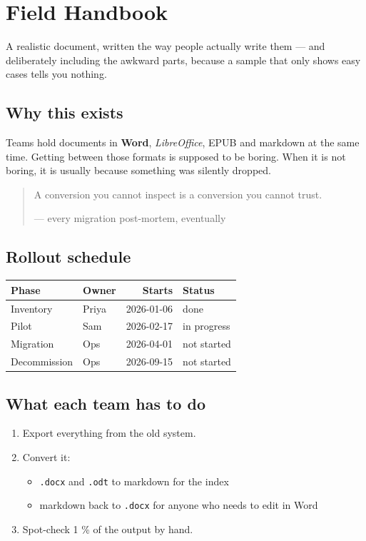 \documentclass[
]{article}
\author{}
\date{}
\newcounter{none} %
\providecommand{\tightlist}{%
  \setlength{\itemsep}{0pt}\setlength{\parskip}{0pt}}
\begin{document}
\section{Field Handbook}\label{field-handbook}

A realistic document, written the way people actually write them --- and
deliberately including the awkward parts, because a sample that only
shows easy cases tells you nothing.

\subsection{Why this exists}\label{why-this-exists}

Teams hold documents in \textbf{Word}, \emph{LibreOffice}, EPUB and
markdown at the same time. Getting between those formats is supposed to
be boring. When it is not boring, it is usually because something was
silently dropped.

\begin{quote}
A conversion you cannot inspect is a conversion you cannot trust.

--- every migration post-mortem, eventually
\end{quote}

\subsection{Rollout schedule}\label{rollout-schedule}

{\def\LTcaptype{none} %
\begin{longtable}[]{@{}llrl@{}}
\toprule\noalign{}
Phase & Owner & Starts & Status \\
\midrule\noalign{}
\endhead
\bottomrule\noalign{}
\endlastfoot
Inventory & Priya & 2026-01-06 & done \\
Pilot & Sam & 2026-02-17 & in progress \\
Migration & Ops & 2026-04-01 & not started \\
Decommission & Ops & 2026-09-15 & not started \\
\end{longtable}
}

\subsection{What each team has to do}\label{what-each-team-has-to-do}

\begin{enumerate}
\def\labelenumi{\arabic{enumi}.}
\tightlist
\item
  Export everything from the old system.
\item
  Convert it:

  \begin{itemize}
  \tightlist
  \item
    \texttt{.docx} and \texttt{.odt} to markdown for the index
  \item
    markdown back to \texttt{.docx} for anyone who needs to edit in Word
  \end{itemize}
\item
  Spot-check 1 \% of the output by hand.
\end{enumerate}
\end{document}
